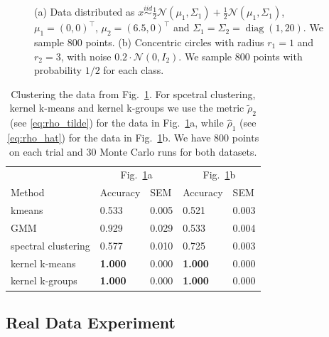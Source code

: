 \documentclass[10pt,journal,compsoc]{IEEEtran}
\DeclareMathOperator{\diag}{diag}
\begin{document}
\begin{figure}
\begin{minipage}{0.2\textwidth}
\end{minipage}
\caption{
\label{fig:2dscatter}
(a) Data distributed as 
$x \stackrel{iid}{\sim}
\tfrac{1}{2}\mathcal{N}(\mu_1,\Sigma_1)+
\tfrac{1}{2}\mathcal{N}(\mu_1,\Sigma_1)$, 
$\mu_1= (0,0)^\top$, 
$\mu_2 = (6.5, 0)^\top$ and 
$\Sigma_1 = \Sigma_2 = \diag(1, 20)$. We sample $800$ points.
(b) Concentric circles with radius $r_1 = 1$ and $r_2 = 3$, with 
noise $0.2 \cdot \mathcal{N}(0, I_2)$. We sample 
800 points with probability $1/2$ for each class.
} 
\end{figure}

\begin{table}
\caption{
\label{tb:cigar_circle}
Clustering the data from Fig.~\ref{fig:2dscatter}.
For spcetral clustering, kernel k-means and kernel k-groups we use
the metric $\widetilde{\rho}_2$ (see \eqref{eq:rho_tilde}) for the data
in Fig.~\ref{fig:2dscatter}a, while $\widehat{\rho}_1$ (see \eqref{eq:rho_hat})
for the data in Fig.~\ref{fig:2dscatter}b. We have 800
points on each trial and 30 Monte Carlo runs for both datasets.
}
\centering
\begin{tabular}{@{}l|ll|ll@{}}
                   & \multicolumn{2}{c|}{Fig.~\ref{fig:2dscatter}a}  &
                     \multicolumn{2}{c}{Fig.~\ref{fig:2dscatter}b}  \\
       Method      & Accuracy & SEM     & Accuracy & SEM \\ \midrule[.5pt]
        kmeans       & 0.533 & 0.005  & 0.521   & 0.003 \\
         GMM         & 0.929 & 0.029  & 0.533   & 0.004 \\
 spectral clustering & 0.577 & 0.010  & 0.725   & 0.003 \\
    kernel k-means   & \textbf{1.000} & 0.000  & \textbf{1.000}   & 0.000 \\
   kernel k-groups   & \textbf{1.000} & 0.000  & \textbf{1.000}  & 0.000  
\end{tabular}
\end{table}


\subsection{Real Data Experiment}
\end{document}
